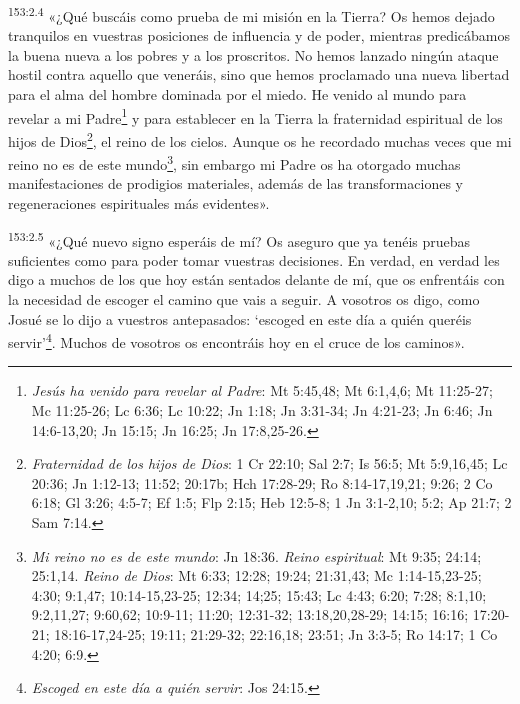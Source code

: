\par 
\textsuperscript{153:2.4} «¿Qué buscáis como prueba de mi misión en la Tierra? Os hemos dejado tranquilos en vuestras posiciones de influencia y de poder, mientras predicábamos la buena nueva a los pobres y a los proscritos. No hemos lanzado ningún ataque hostil contra aquello que veneráis, sino que hemos proclamado una nueva libertad para el alma del hombre dominada por el miedo. He venido al mundo para revelar a mi Padre\footnote{\textit{Jesús ha venido para revelar al Padre}: Mt 5:45,48; Mt 6:1,4,6; Mt 11:25-27; Mc 11:25-26; Lc 6:36; Lc 10:22; Jn 1:18; Jn 3:31-34; Jn 4:21-23; Jn 6:46; Jn 14:6-13,20; Jn 15:15; Jn 16:25; Jn 17:8,25-26.} y para establecer en la Tierra la fraternidad espiritual de los hijos de Dios\footnote{\textit{Fraternidad de los hijos de Dios}: 1 Cr 22:10; Sal 2:7; Is 56:5; Mt 5:9,16,45; Lc 20:36; Jn 1:12-13; 11:52; 20:17b; Hch 17:28-29; Ro 8:14-17,19,21; 9:26; 2 Co 6:18; Gl 3:26; 4:5-7; Ef 1:5; Flp 2:15; Heb 12:5-8; 1 Jn 3:1-2,10; 5:2; Ap 21:7; 2 Sam 7:14.}, el reino de los cielos. Aunque os he recordado muchas veces que mi reino no es de este mundo\footnote{\textit{Mi reino no es de este mundo}: Jn 18:36. \textit{Reino espiritual}: Mt 9:35; 24:14; 25:1,14. \textit{Reino de Dios}: Mt 6:33; 12:28; 19:24; 21:31,43; Mc 1:14-15,23-25; 4:30; 9:1,47; 10:14-15,23-25; 12:34; 14;25; 15:43; Lc 4:43; 6:20; 7:28; 8:1,10; 9:2,11,27; 9:60,62; 10:9-11; 11:20; 12:31-32; 13:18,20,28-29; 14:15; 16:16; 17:20-21; 18:16-17,24-25; 19:11; 21:29-32; 22:16,18; 23:51; Jn 3:3-5; Ro 14:17; 1 Co 4:20; 6:9.}, sin embargo mi Padre os ha otorgado muchas manifestaciones de prodigios materiales, además de las transformaciones y regeneraciones espirituales más evidentes».

\par 
\textsuperscript{153:2.5} «¿Qué nuevo signo esperáis de mí? Os aseguro que ya tenéis pruebas suficientes como para poder tomar vuestras decisiones. En verdad, en verdad les digo a muchos de los que hoy están sentados delante de mí, que os enfrentáis con la necesidad de escoger el camino que vais a seguir. A vosotros os digo, como Josué se lo dijo a vuestros antepasados: `escoged en este día a quién queréis servir'\footnote{\textit{Escoged en este día a quién servir}: Jos 24:15.}. Muchos de vosotros os encontráis hoy en el cruce de los caminos».

